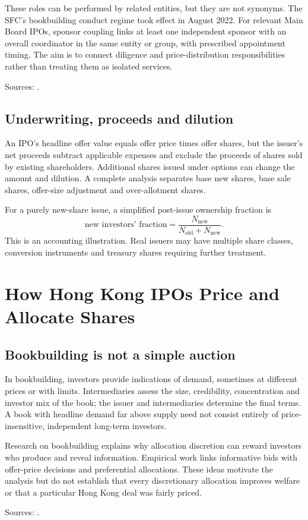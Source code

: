 \documentclass[11pt,a4paper]{article}
\newcommand{\source}[1]{\par{\footnotesize\color{ink}Sources: \cite{#1}.}\par}
\begin{document}
These roles can be performed by related entities, but they are not synonyms. The SFC's bookbuilding conduct regime took effect in August 2022. For relevant Main Board IPOs, sponsor coupling links at least one independent sponsor with an overall coordinator in the same entity or group, with prescribed appointment timing. The aim is to connect diligence and price-distribution responsibilities rather than treating them as isolated services.\source{sponsor,sfccode}

\subsection{Underwriting, proceeds and dilution}
An IPO's headline offer value equals offer price times offer shares, but the issuer's net proceeds subtract applicable expenses and exclude the proceeds of shares sold by existing shareholders. Additional shares issued under options can change the amount and dilution. A complete analysis separates base new shares, base sale shares, offer-size adjustment and over-allotment shares.

For a purely new-share issue, a simplified post-issue ownership fraction is
\[
\text{new investors' fraction}=\frac{N_{\mathrm{new}}}{N_{\mathrm{old}}+N_{\mathrm{new}}}.
\]
This is an accounting illustration. Real issuers may have multiple share classes, conversion instruments and treasury shares requiring further treatment.

\section{How Hong Kong IPOs Price and Allocate Shares}
\subsection{Bookbuilding is not a simple auction}
In bookbuilding, investors provide indications of demand, sometimes at different prices or with limits. Intermediaries assess the size, credibility, concentration and investor mix of the book; the issuer and intermediaries determine the final terms. A book with headline demand far above supply need not consist entirely of price-insensitive, independent long-term investors.

Research on bookbuilding explains why allocation discretion can reward investors who produce and reveal information. Empirical work links informative bids with offer-price decisions and preferential allocations. These ideas motivate the analysis but do not establish that every discretionary allocation improves welfare or that a particular Hong Kong deal was fairly priced.\source{bookresearch,allocationresearch}
\end{document}
